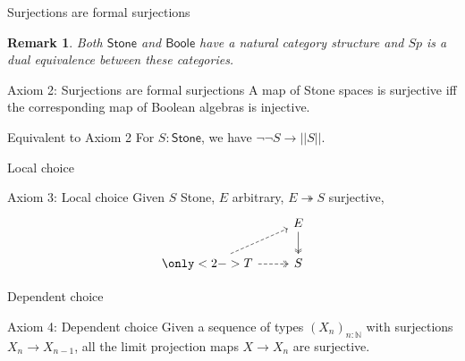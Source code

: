\documentclass{beamer}
\newcommand{\Boole}{\mathsf{Boole}}
\newcommand{\Stone}{\mathsf{Stone}}
\newtheorem{remark}{Remark}
\begin{document}
\begin{frame}{Surjections are formal surjections}
  \begin{remark}
    Both $\Stone$ and $\Boole$ have a natural category structure and $Sp$
    is a dual equivalence between these categories. 
  \end{remark}
  \pause
  \begin{block}{Axiom 2: Surjections are formal surjections}
    A map of Stone spaces is surjective iff the corresponding map of Boolean algebras is injective. 
  \end{block}
  \pause
  \begin{block}{Equivalent to Axiom 2}
    For $S:\Stone$, we have $\neg \neg S \to || S||$. 
  \end{block}
\end{frame}






\begin{frame}[fragile]{Local choice}
  \begin{block}{Axiom 3: Local choice}
  Given $S$ Stone, $E$ arbitrary, %
  $E\twoheadrightarrow S$ surjective, 
   \begin{equation*}\begin{tikzcd}
    & E \arrow[d,""',two heads]\\
      \only<2->{
      T \arrow [r, two heads,dashed] \arrow [ur,dashed]
      } 
       & S
    \end{tikzcd}\end{equation*}  
  \end{block}
\end{frame}
\begin{frame}{Dependent choice}
\begin{block}{Axiom 4: Dependent choice}
  Given a sequence of types $(X_n)_{n:\mathbb N}$ with surjections 
  $X_n \to X_{n-1}$, all the limit projection maps $X \to X_n$ are surjective. 
\end{block}
\end{frame}
\end{document}
